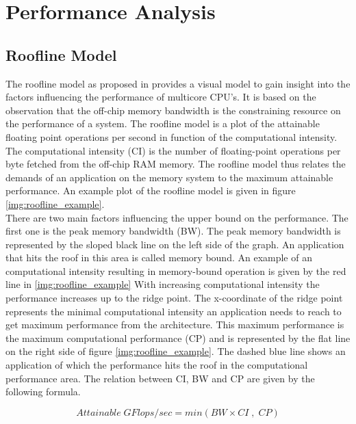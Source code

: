 
\chapter{Performance Analysis}

\section{Roofline Model}

The roofline model as proposed in \cite{Williams:2009:RIV:1498765.1498785} provides a visual model to gain insight into the factors influencing the performance of multicore CPU's.
It is based on the observation that the off-chip memory bandwidth is the constraining resource on the performance of a system.\cite{patterson2004latency}  The roofline model is a plot of the attainable floating point operations per second in function of the computational intensity. The computational intensity (CI) is the number of floating-point operations per byte fetched from the off-chip RAM memory. The roofline model thus relates the demands of an application on the memory system to the maximum attainable performance.
An example plot of the roofline model is given in figure \ref{img:roofline_example}.\\

There are two main factors influencing the upper bound on the performance. The first one is the peak memory bandwidth (BW). The peak memory bandwidth is represented by the sloped  black line on the left side of the graph. An application that hits the roof in this area is called memory bound. An example of an computational intensity resulting in memory-bound operation is given by the red line in \ref{img:roofline_example} With increasing computational intensity the performance increases up to the ridge point. The x-coordinate of the ridge point represents the minimal computational intensity an application needs to reach to get maximum performance from the architecture. This maximum performance is the maximum computational performance (CP) and is represented by the flat line on the right side of figure \ref{img:roofline_example}. The dashed blue line shows an application of which the performance hits the roof in the computational performance area.
The relation between CI, BW and CP are given by the following formula.

\begin{equation}
Attainable\;GFlops/sec = min \left( BW \times CI \; , \; CP \right)
\end{equation}


